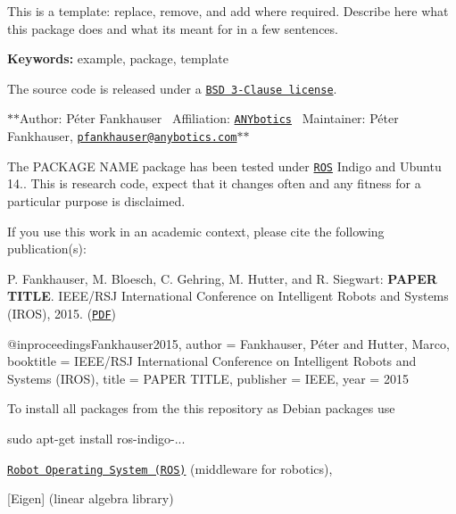 This is a template\+: replace, remove, and add where required. Describe here what this package does and what it\textquotesingle{}s meant for in a few sentences.

{\bfseries Keywords\+:} example, package, template

The source code is released under a \href{ros_package_template/LICENSE}{\tt B\+SD 3-\/\+Clause license}.

$\ast$$\ast$\+Author\+: Péter Fankhauser~\newline
 Affiliation\+: \href{https://www.anybotics.com/}{\tt A\+N\+Ybotics}~\newline
 Maintainer\+: Péter Fankhauser, \href{mailto:pfankhauser@anybotics.com}{\tt pfankhauser@anybotics.\+com}$\ast$$\ast$

The P\+A\+C\+K\+A\+GE N\+A\+ME package has been tested under \href{http://www.ros.org}{\tt R\+OS} Indigo and Ubuntu 14.. This is research code, expect that it changes often and any fitness for a particular purpose is disclaimed.

\href{http://rsl-ci.ethz.ch/job/ros_best_practices/}{\tt }



If you use this work in an academic context, please cite the following publication(s)\+:


\begin{DoxyItemize}
\item P. Fankhauser, M. Bloesch, C. Gehring, M. Hutter, and R. Siegwart\+: {\bfseries P\+A\+P\+ER T\+I\+T\+LE}. I\+E\+E\+E/\+R\+SJ International Conference on Intelligent Robots and Systems (I\+R\+OS), 2015. (\href{http://dx.doi.org/10.3929/ethz-a-010173654}{\tt P\+DF}) \begin{DoxyVerb}  @inproceedings{Fankhauser2015,
      author = {Fankhauser, P\'{e}ter and Hutter, Marco},
      booktitle = {IEEE/RSJ International Conference on Intelligent Robots and Systems (IROS)},
      title = {{PAPER TITLE}},
      publisher = {IEEE},
      year = {2015}
  }
\end{DoxyVerb}

\end{DoxyItemize}

To install all packages from the this repository as Debian packages use \begin{DoxyVerb}sudo apt-get install ros-indigo-...
\end{DoxyVerb}



\begin{DoxyItemize}
\item \href{http://wiki.ros.org}{\tt Robot Operating System (R\+OS)} (middleware for robotics),
\item \mbox{[}Eigen\mbox{]} (linear algebra library)
\end{DoxyItemize}


